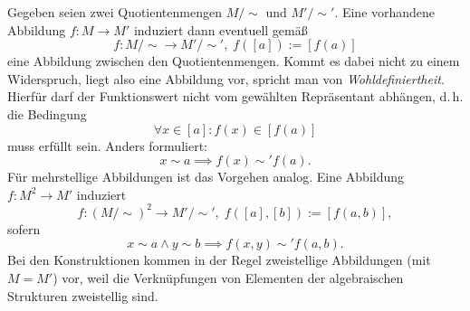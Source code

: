 Gegeben seien zwei Quotientenmengen $M/\sim$ und $M'/\sim'$.
Eine vorhandene Abbildung $f\colon M\to M'$ induziert dann
eventuell gemäß%
\begin{equation}\label{eq:induzierte-Abbildung}
f\colon M/\sim\to M'/\sim',\; f([a]):=[f(a)]
\end{equation}
eine Abbildung zwischen den Quotientenmengen. Kommt es dabei nicht
zu einem Widerspruch, liegt also eine Abbildung vor, spricht man
von \emph{Wohldefiniertheit}. Hierfür darf der Funktionswert nicht
vom gewählten Repräsentant abhängen, d.\,h. die Bedingung%
\begin{equation}
\forall x\in [a]\colon f(x)\in [f(a)]
\end{equation}
muss erfüllt sein. Anders formuliert:
\begin{equation}
x\sim a \implies f(x)\sim' f(a).
\end{equation}
Für mehrstellige Abbildungen ist das Vorgehen analog. Eine
Abbildung $f\colon M^2\to M'$ induziert%
\begin{equation}
f\colon (M/\sim)^2\to M'/\sim',\; f([a],[b]):=[f(a,b)],
\end{equation}
sofern
\begin{equation}
x\sim a\land y\sim b\implies f(x,y)\sim' f(a,b).
\end{equation}
Bei den Konstruktionen kommen in der Regel zweistellige Abbildungen
(mit $M=M'$) vor, weil die Verknüpfungen von Elementen der algebraischen
Strukturen zweistellig sind.

